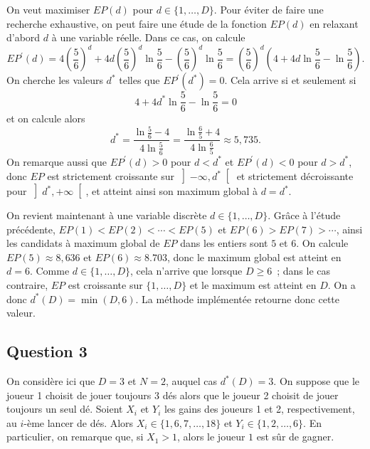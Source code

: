 \documentclass[a4paper,11pt]{amsart}
\theoremstyle{plain}
\begin{document}
On veut maximiser $EP(d)$ pour $d \in \{1, \dotsc, D\}$. Pour éviter de faire une recherche exhaustive, on peut faire une étude de la fonction $EP(d)$ en relaxant d'abord $d$ à une variable réelle. Dans ce cas, on calcule
\[
EP^\prime(d) = 4 \left(\frac{5}{6}\right)^d + 4 d \left(\frac{5}{6}\right)^d \ln \frac{5}{6} - \left(\frac{5}{6}\right)^d \ln \frac{5}{6} = \left(\frac{5}{6}\right)^d \left(4 + 4 d \ln \frac{5}{6} - \ln\frac{5}{6}\right).
\]
On cherche les valeurs $d^\ast$ telles que $EP^\prime(d^\ast) = 0$. Cela arrive si et seulement si
\[
4 + 4 d^\ast \ln \frac{5}{6} - \ln\frac{5}{6} = 0
\]
et on calcule alors
\[
d^\ast = \frac{\ln \frac{5}{6} - 4}{4 \ln \frac{5}{6}} = \frac{\ln \frac{6}{5} + 4}{4 \ln \frac{6}{5}} \approx 5,735.
\]
On remarque aussi que $EP^\prime(d) > 0$ pour $d < d^\ast$ et $EP^\prime(d) < 0$ pour $d > d^\ast$, donc $EP$ est strictement croissante sur $\left]-\infty, d^\ast\right[$ et strictement décroissante pour $\left]d^\ast, +\infty\right[$, et atteint ainsi son maximum global à $d = d^\ast$.

On revient maintenant à une variable discrète $d \in \{1, \dotsc, D\}$. Grâce à l'étude précédente, $EP(1) < EP(2) < \dotsb <EP(5)$ et $EP(6) > EP(7) > \dotsb$, ainsi les candidats à maximum global de $EP$ dans les entiers sont $5$ et $6$. On calcule $EP(5) \approx 8,636$ et $EP(6) \approx 8.703$, donc le maximum global est atteint en $d = 6$. Comme $d \in \{1, \dotsc, D\}$, cela n'arrive que lorsque $D \geq 6$~; dans le cas contraire, $EP$ est croissante sur $\{1, \dotsc, D\}$ et le maximum est atteint en $D$. On a donc $d^\ast(D) = \min(D, 6)$. La méthode implémentée retourne donc cette valeur.


\subsection{Question 3}

On considère ici que $D = 3$ et $N = 2$, auquel cas $d^\ast(D) = 3$. On suppose que le joueur 1 choisit de jouer toujours $3$ dés alors que le joueur 2 choisit de jouer toujours un seul dé. Soient $X_i$ et $Y_i$ les gains des joueurs 1 et 2, respectivement, au $i$-ème lancer de dés. Alors $X_i \in \{1, 6, 7, \dotsc, 18\}$ et $Y_i \in \{1, 2, \dotsc, 6\}$. En particulier, on remarque que, si $X_1 > 1$, alors le joueur $1$ est sûr de gagner.
\end{document}
